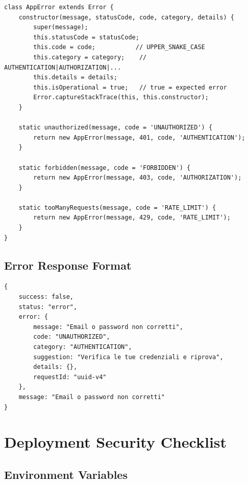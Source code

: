 \documentclass[12pt,a4paper]{report}
\begin{document}
\begin{lstlisting}[caption={AppError Class Hierarchy}]
class AppError extends Error {
    constructor(message, statusCode, code, category, details) {
        super(message);
        this.statusCode = statusCode;
        this.code = code;           // UPPER_SNAKE_CASE
        this.category = category;    // AUTHENTICATION|AUTHORIZATION|...
        this.details = details;
        this.isOperational = true;   // true = expected error
        Error.captureStackTrace(this, this.constructor);
    }
    
    static unauthorized(message, code = 'UNAUTHORIZED') {
        return new AppError(message, 401, code, 'AUTHENTICATION');
    }
    
    static forbidden(message, code = 'FORBIDDEN') {
        return new AppError(message, 403, code, 'AUTHORIZATION');
    }
    
    static tooManyRequests(message, code = 'RATE_LIMIT') {
        return new AppError(message, 429, code, 'RATE_LIMIT');
    }
}
\end{lstlisting}

\section{Error Response Format}

\begin{lstlisting}[caption={Standard Error Response}]
{
    success: false,
    status: "error",
    error: {
        message: "Email o password non corretti",
        code: "UNAUTHORIZED",
        category: "AUTHENTICATION",
        suggestion: "Verifica le tue credenziali e riprova",
        details: {},
        requestId: "uuid-v4"
    },
    message: "Email o password non corretti"
}
\end{lstlisting}

\chapter{Deployment Security Checklist}

\section{Environment Variables}
\end{document}
